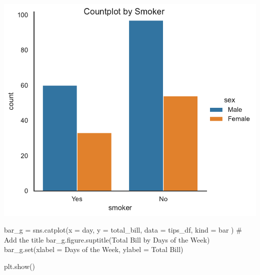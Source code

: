 \documentclass[
  letterpaper,
  DIV=11,
  numbers=noendperiod]{scrartcl}
\newenvironment{Shaded}{\begin{snugshade}}{\end{snugshade}}
\newcommand{\BuiltInTok}[1]{\textcolor[rgb]{0.00,0.46,0.62}{#1}}
\newcommand{\CommentTok}[1]{\textcolor[rgb]{0.37,0.37,0.37}{#1}}
\newcommand{\NormalTok}[1]{\textcolor[rgb]{0.00,0.46,0.62}{#1}}
\newcommand{\OperatorTok}[1]{\textcolor[rgb]{0.37,0.37,0.37}{#1}}
\newcommand{\StringTok}[1]{\textcolor[rgb]{0.13,0.47,0.30}{#1}}
\begin{document}
\includegraphics{data_visualization_with_seaborn_files/figure-pdf/cell-14-output-1.pdf}

\begin{Shaded}
\begin{Highlighting}[]
\NormalTok{bar\_g }\OperatorTok{=}\NormalTok{ sns.catplot(x }\OperatorTok{=} \StringTok{\textquotesingle{}day\textquotesingle{}}\NormalTok{,}
\NormalTok{                    y }\OperatorTok{=} \StringTok{\textquotesingle{}total\_bill\textquotesingle{}}\NormalTok{,}
\NormalTok{                    data }\OperatorTok{=}\NormalTok{ tips\_df,}
\NormalTok{                    kind }\OperatorTok{=} \StringTok{\textquotesingle{}bar\textquotesingle{}}
\NormalTok{                  )}
\CommentTok{\# Add the title}
\NormalTok{bar\_g.figure.suptitle(}\StringTok{\textquotesingle{}Total Bill by Days of the Week\textquotesingle{}}\NormalTok{)}
\NormalTok{bar\_g.}\BuiltInTok{set}\NormalTok{(xlabel }\OperatorTok{=} \StringTok{\textquotesingle{}Days of the Week\textquotesingle{}}\NormalTok{,}
\NormalTok{          ylabel }\OperatorTok{=} \StringTok{\textquotesingle{}Total Bill\textquotesingle{}}\NormalTok{)}

\NormalTok{plt.show()}
\end{Highlighting}
\end{Shaded}
\end{document}
